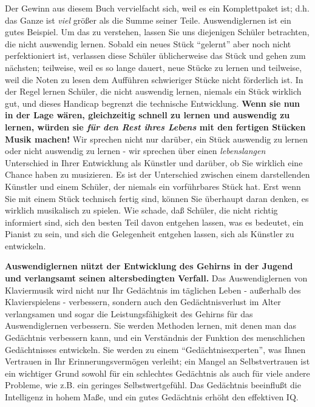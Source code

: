 Der Gewinn aus diesem Buch vervielfacht sich, weil es ein Komplettpaket ist; d.h. das Ganze ist \textit{viel} größer als die Summe seiner Teile.
Auswendiglernen ist ein gutes Beispiel.
Um das zu verstehen, lassen Sie uns diejenigen Schüler betrachten, die nicht auswendig lernen.
Sobald ein neues Stück \enquote{gelernt} aber noch nicht perfektioniert ist, verlassen diese Schüler üblicherweise das Stück und gehen zum nächsten; teilweise, weil es so lange dauert, neue Stücke zu lernen und teilweise, weil die Noten zu lesen dem Aufführen schwieriger Stücke nicht förderlich ist.
In der Regel lernen Schüler, die nicht auswendig lernen, niemals ein Stück wirklich gut, und dieses Handicap begrenzt die technische Entwicklung.
\textbf{Wenn sie nun in der Lage wären, gleichzeitig schnell zu lernen und auswendig zu lernen, würden sie \textit{für den Rest ihres Lebens} mit den fertigen Stücken Musik machen!}
Wir sprechen nicht nur darüber, ein Stück auswendig zu lernen oder nicht auswendig zu lernen - wir sprechen über einen \textit{lebenslangen} Unterschied in Ihrer Entwicklung als Künstler und darüber, ob Sie wirklich eine Chance haben zu musizieren.
Es ist der Unterschied zwischen einem darstellenden Künstler und einem Schüler, der niemals ein vorführbares Stück hat.
Erst wenn Sie mit einem Stück technisch fertig sind, können Sie überhaupt daran denken, es wirklich musikalisch zu spielen.
Wie schade, daß Schüler, die nicht richtig informiert sind, sich den besten Teil davon entgehen lassen, was es bedeutet, ein Pianist zu sein, und sich die Gelegenheit entgehen lassen, sich als Künstler zu entwickeln.

\textbf{Auswendiglernen nützt der Entwicklung des Gehirns in der Jugend und verlangsamt seinen altersbedingten Verfall.} Das Auswendiglernen von Klaviermusik wird nicht nur Ihr Gedächtnis im täglichen Leben - außerhalb des Klavierspielens - verbessern, sondern auch den Gedächtnisverlust im Alter verlangsamen und sogar die Leistungsfähigkeit des Gehirns für das Auswendiglernen verbessern.
Sie werden Methoden lernen, mit denen man das Gedächtnis verbessern kann, und ein Verständnis der Funktion des menschlichen Gedächtnisses entwickeln.
Sie werden zu einem \enquote{Gedächtnisexperten}, was Ihnen Vertrauen in Ihr Erinnerungsvermögen verleiht; ein Mangel an Selbstvertrauen ist ein wichtiger Grund sowohl für ein schlechtes Gedächtnis als auch für viele andere Probleme, wie z.B. ein geringes Selbstwertgefühl.
Das Gedächtnis beeinflußt die Intelligenz in hohem Maße, und ein gutes Gedächtnis erhöht den effektiven IQ.

